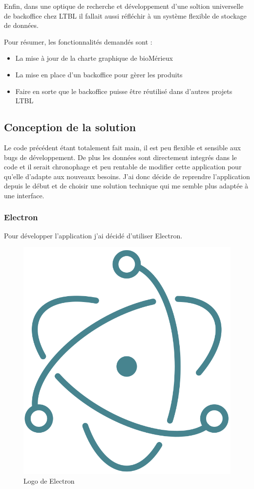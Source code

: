 Enfin, dans une optique de recherche et développement d'une soltion universelle de backoffice chez LTBL il fallait aussi réfléchir à un système flexible de stockage de données.

Pour résumer, les fonctionnalités demandés sont :

\begin{itemize}
    \item La mise à jour de la charte graphique de bioMérieux
    \item La mise en place d'un backoffice pour gèrer les produits
    \item Faire en sorte que le backoffice puisse être réutilisé dans d'autres projets LTBL
\end{itemize}


\subsection{Conception de la solution}

Le code précédent étant totalement fait main, il est peu flexible et sensible aux bugs de développement.
De plus les données sont directement integrés dans le code et il serait chronophage et peu rentable de modifier cette application pour qu'elle d'adapte aux nouveaux besoins.
J'ai donc décide de reprendre l'application depuis le début et de choisir une solution technique qui me semble plus adaptée à une interface.

\subsubsection{Electron}

Pour développer l'application j'ai décidé d'utiliser Electron.

\begin{figure}[h]
    \centering
    \includegraphics[scale=0.2]{img/electron.png}
    \caption{Logo de Electron}
\end{figure}

